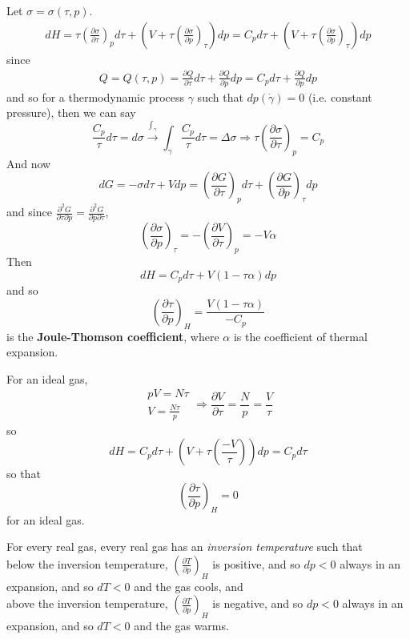 \documentclass[10pt]{amsart}
\begin{document}
\begin{multicols*}{2}
Let $\sigma = \sigma(\tau,p)$.  
\[
\begin{gathered}
  dH = \tau \left( \frac{ \partial \sigma}{ \partial \tau } \right)_p d\tau + (V + \tau \left( \frac{ \partial \sigma }{ \partial p }\right)_{\tau} ) dp = C_p d\tau + (V + \tau \left( \frac{ \partial \sigma }{ \partial p }\right)_{\tau} ) dp
\end{gathered}
\]
since
\[
\begin{gathered}
Q = Q(\tau,p) = \frac{ \partial Q}{ \partial \tau} d\tau + \frac{ \partial Q}{ \partial p } dp = C_p d\tau + \frac{ \partial Q}{ \partial p} dp
\end{gathered}
\]
and so for a thermodynamic process $\gamma$ such that $dp(\dot{\gamma})=0$ (i.e. constant pressure), then we can say
\[
\frac{C_p}{\tau}d\tau = d\sigma \xrightarrow{ \int_{\gamma } } \int_{\gamma} \frac{C_p}{\tau} d\tau = \Delta \sigma \Longrightarrow \tau \left( \frac{ \partial \sigma }{ \partial \tau } \right)_p = C_p
\]
And now 
\[
dG = -\sigma d\tau  + Vdp = \left( \frac{ \partial G}{ \partial \tau } \right)_p d\tau + \left( \frac{ \partial G}{ \partial p } \right)_{\tau} dp
\]
and since $\frac{ \partial^2 G}{ \partial \tau \partial p} = \frac{ \partial^2 G}{ \partial p \partial \tau}$, 
\[
\left( \frac{ \partial \sigma }{ \partial p } \right)_{\tau} = - \left( \frac{ \partial V}{ \partial \tau} \right)_p = -V\alpha
\]
Then
\[
dH = C_p d\tau + V(1-\tau \alpha) dp
\]
and so 
\begin{equation}\label{Eq:JouleThomsoncoeff}
\left( \frac{ \partial \tau}{ \partial p }\right)_H = \frac{ V(1-\tau \alpha )}{-C_p}
\end{equation}
is the \textbf{Joule-Thomson coefficient}, where $\alpha$ is the coefficient of thermal expansion.  

For an ideal gas, 
\[
\begin{gathered}
  pV = N\tau \\ 
  V = \frac{N\tau}{p}
\end{gathered} \Longrightarrow \frac{ \partial V}{ \partial \tau} = \frac{N}{p} = \frac{V}{\tau}
\]
so
\[
dH = C_pd\tau + ( V + \tau \left( \frac{-V}{\tau} \right) ) dp = C_p d\tau 
\]
so that 
\[
\left( \frac{ \partial \tau}{ \partial p} \right)_H = 0 
\]
for an ideal gas.  

For every real gas, every real gas has an \emph{inversion temperature} such that \\
below the inversion temperature, $\left( \frac{ \partial T}{ \partial p} \right)_H$ is positive, and so $dp <0$ always in an expansion, and so $dT <0$ and the gas cools, and \\
above the inversion temperature, $\left( \frac{ \partial T}{ \partial p} \right)_H$ is negative, and so $dp <0$ always in an expansion, and so $dT <0$ and the gas warms.  


\end{multicols*}
\end{document}

